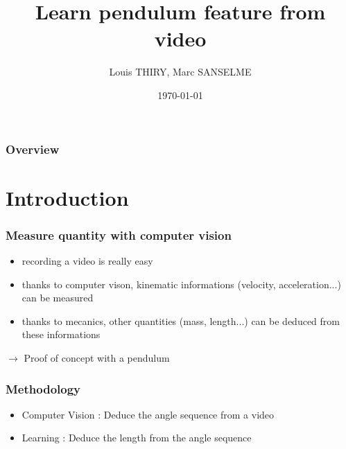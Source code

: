 \documentclass{beamer}
\title[Project Object Recognition]{Learn pendulum feature from video}
\author{Louis THIRY, Marc SANSELME}
\institute[MVA]
{ENS-Cachan}
\date{\today}
\begin{document}
\begin{frame}
\titlepage
\end{frame}

\begin{frame}
\frametitle{Overview}
\tableofcontents
\end{frame}


\section{Introduction}

\begin{frame}
\frametitle{Measure quantity with computer vision}
\begin{itemize}
  \item recording a video is really easy
  \item thanks to computer vison, kinematic informations (velocity, acceleration...) can be measured
  \item thanks to mecanics, other quantities (mass, length...) can be deduced from these informations
\end{itemize}
$\rightarrow$ Proof of concept with a pendulum
\end{frame}


\begin{frame}
\frametitle{Methodology}
\begin{itemize}
  \item Computer Vision : Deduce the angle sequence from a video
  \item Learning : Deduce the length from the angle sequence
\end{itemize}
\end{frame}
\end{document}
